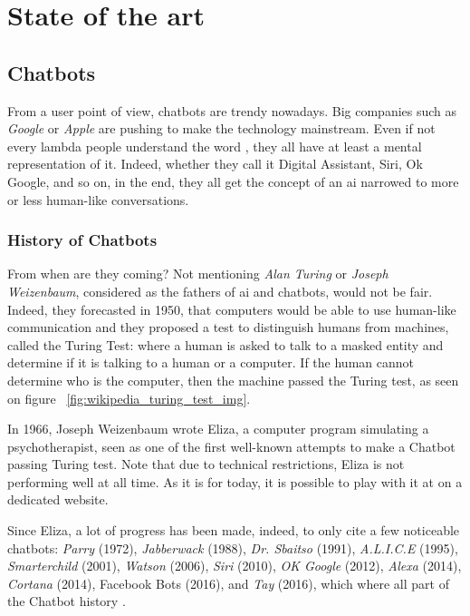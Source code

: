 \chapter{State of the art}
\label{chap:state-of-the-art}

\section{Chatbots}
From a user point of view, chatbots are trendy nowadays. Big companies such as \textit{Google} or \textit{Apple} are pushing to make the technology mainstream. Even if not every lambda people understand the word , they all have at least a mental representation of it. Indeed, whether they call it Digital Assistant, Siri, Ok Google, and so on, in the end, they all get the concept of an \gls{ai} narrowed to more or less human-like conversations.

\subsection{History of Chatbots}
From when are they coming? Not mentioning \textit{Alan Turing} or \textit{Joseph Weizenbaum}, considered as the fathers of \gls{ai} and chatbots, would not be fair. Indeed, they forecasted in 1950, that computers would be able to use human-like communication and they proposed a test to distinguish humans from machines, called the Turing Test\cite{paper:turing}: where a human is asked to talk to a masked entity and determine if it is talking to a human or a computer. If the human cannot determine who is the computer, then the machine passed the Turing test, as seen on figure ~\ref{fig:wikipedia_turing_test_img}. 

In 1966, Joseph Weizenbaum wrote Eliza\cite{chatbot:eliza}, a computer program simulating a psychotherapist, seen as one of the first well-known attempts to make a Chatbot passing Turing test. Note that due to technical restrictions, Eliza is not performing well at all time. As it is for today, it is possible to play with it at on a dedicated website.

Since Eliza, a lot of progress has been made, indeed, to only cite a few noticeable chatbots: \textit{Parry}\cite{chatbot:parry} (1972), \textit{Jabberwack}\cite{chatbot:jabberwack} (1988), \textit{Dr. Sbaitso}\cite{chatbot:dr-sbaitso} (1991), \textit{A.L.I.C.E}\cite{chatbot:alice} (1995), \textit{Smarterchild}\cite{chatbot:smarterchild} (2001), \textit{Watson}\cite{chatbot:watson} (2006), \textit{Siri}\cite{chatbot:siri} (2010), \textit{OK Google}\cite{chatbot:google} (2012), \textit{Alexa}\cite{chatbot:alexa} (2014), \textit{Cortana}\cite{chatbot:cortana} (2014), Facebook Bots\cite{chatbot:facebook} (2016), and \textit{Tay}\cite{chatbot:tay} (2016), which where all part of the Chatbot history \cite{chatbot:futurism_history_infography}.

